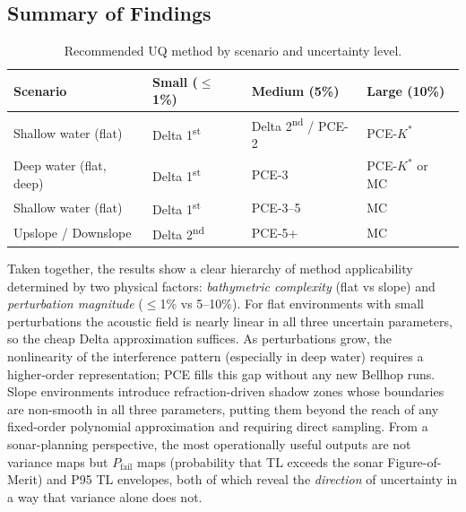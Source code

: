 \documentclass[11pt,a4paper]{article}
\begin{document}
\subsection{Summary of Findings}
\label{sec:summary}

\begin{table}[H]
  \centering
  \caption{Recommended UQ method by scenario and uncertainty level.}
  \label{tab:recommendation}
  \begin{tabular}{llll}
    \toprule
    Scenario & Small ($\leq$1\%) & Medium (5\%) & Large (10\%) \\
    \midrule
    Shallow water (flat)   & Delta 1\textsuperscript{st}  & Delta 2\textsuperscript{nd} / PCE-2 & PCE-$K^*$ \\
    Deep water (flat, deep)    & Delta 1\textsuperscript{st}  & PCE-3                               & PCE-$K^*$ or MC \\
    Shallow water (flat)       & Delta 1\textsuperscript{st}  & PCE-3--5                            & MC \\
    Upslope / Downslope        & Delta 2\textsuperscript{nd}  & PCE-5+                              & MC \\
    \bottomrule
  \end{tabular}
\end{table}

Taken together, the results show a clear hierarchy of method applicability
determined by two physical factors: \emph{bathymetric complexity} (flat vs
slope) and \emph{perturbation magnitude} ($\leq$1\% vs 5--10\%).
For flat environments with small perturbations the acoustic field is nearly
linear in all three uncertain parameters, so the cheap Delta approximation
suffices.  As perturbations grow, the nonlinearity of the interference pattern
(especially in deep water) requires a higher-order representation; PCE fills
this gap without any new Bellhop runs.  Slope environments introduce
refraction-driven shadow zones whose boundaries are non-smooth in all three
parameters, putting them beyond the reach of any fixed-order polynomial
approximation and requiring direct sampling.  From a sonar-planning perspective,
the most operationally useful outputs are not variance maps but
$P_\mathrm{fail}$ maps (probability that TL exceeds the sonar Figure-of-Merit)
and P95 TL envelopes, both of which reveal the \emph{direction} of uncertainty
in a way that variance alone does not.
\end{document}
